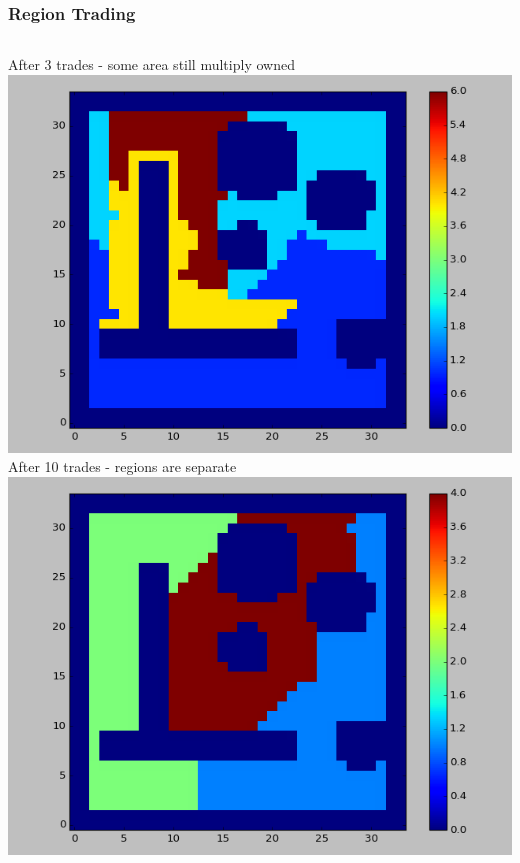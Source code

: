 \documentclass{beamer}
\begin{document}
    \begin{frame}
        \frametitle{Region Trading}
        
        \begin{columns}
        After 3 trades - some area still multiply owned
        \includegraphics[width=\columnwidth]{rt_before.png}
        After 10 trades - regions are separate
        \includegraphics[width=\columnwidth]{rt_after.png}
        \end{columns}
    \end{frame}
    
\end{document}
